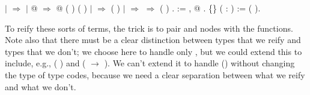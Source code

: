 \begin{coqdoccode}
\coqdocindent{3.50em}
\ensuremath{|}  \ensuremath{\Rightarrow} \coqdoceol
\coqdocindent{3.50em}
\ensuremath{|} @ \coqdocvar{\_}   \ensuremath{\Rightarrow} @ ( ) ( )\coqdoceol
\coqdocindent{3.50em}
\ensuremath{|}    \ensuremath{\Rightarrow}   ( )\coqdoceol
\coqdocindent{3.50em}
\ensuremath{|}   \ensuremath{\Rightarrow}   \ensuremath{\Rightarrow}  ( )\coqdoceol
\coqdocindent{3.50em}
.\coqdoceol
\coqdocemptyline
\coqdocindent{1.00em}
   := \coqdockw{\ensuremath{\forall}} , @  .\coqdoceol
\coqdocindent{1.00em}
  \{\} ( :  ) :=  ( ).\coqdoceol
\coqdocemptyline
\end{coqdoccode}
To reify these sorts of terms, the trick is to pair  and
       nodes with the functions.  Note also that there must be a
      clear distinction between types that we reify and types that we
      don't; we choose here to handle only  , but we could
      extend this to include, e.g.,  ( ) and  (
      \ensuremath{\rightarrow} ).  We can't extend it to handle  ()
      without changing the type of type codes, because we need a clear
      separation between what we reify and what we don't. 

